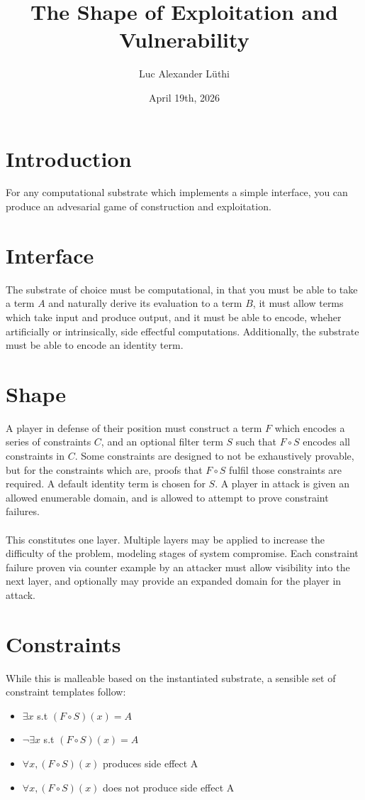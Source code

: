 \documentclass{article}
\title{The Shape of Exploitation and Vulnerability}
\author{Luc Alexander L{\"u}thi}
\date{April 19th, 2026}
\begin{document}
	\maketitle
	\tableofcontents
	\section{Introduction}
	For any computational substrate which implements a simple interface, you can produce an advesarial game of construction and exploitation. 
	\section{Interface}
	The substrate of choice must be computational, in that you must be able to take a term $A$ and naturally derive its evaluation to a term $B$, it must allow terms which take input and produce output, and it must be able to encode, wheher artificially or intrinsically, side effectful computations. Additionally, the substrate must be able to encode an identity term. 
	\section{Shape}
	A player in defense of their position must construct a term $F$ which encodes a series of constraints $C$, and an optional filter term $S$ such that $F \circ S$ encodes all constraints in $C$. Some constraints are designed to not be exhaustively provable, but for the constraints which are, proofs that $F \circ S$ fulfil those constraints are required. A default identity term is chosen for $S$. A player in attack is given an allowed enumerable domain, and is allowed to attempt to prove constraint failures. \\\\
	This constitutes one layer. Multiple layers may be applied to increase the difficulty of the problem, modeling stages of system compromise. Each constraint failure proven via counter example by an attacker must allow visibility into the next layer, and optionally may provide an expanded domain for the player in attack. 
	\section{Constraints}
	While this is malleable based on the instantiated substrate, a sensible set of constraint templates follow:
	\begin{itemize}
		\item[] $\exists x$ s.t $(F\circ S)(x) = A$
		\item[] $\neg\exists x$ s.t $(F\circ S)(x) = A$
		\item[] $\forall x, (F\circ S)(x)$ produces side effect A
		\item[] $\forall x, (F\circ S)(x)$ does not produce side effect A
	\end{itemize}
\end{document}

